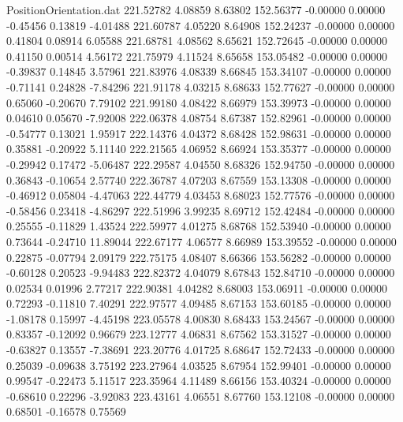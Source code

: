 \begin{filecontents}{PositionOrientation.dat}
 221.52782    4.08859    8.63802   152.56377   -0.00000    0.00000   -0.45456    0.13819   -4.01488
 221.60787    4.05220    8.64908   152.24237   -0.00000    0.00000    0.41804    0.08914    6.05588
 221.68781    4.08562    8.65621   152.72645   -0.00000    0.00000    0.41150    0.00514    4.56172
 221.75979    4.11524    8.65658   153.05482   -0.00000    0.00000   -0.39837    0.14845    3.57961
 221.83976    4.08339    8.66845   153.34107   -0.00000    0.00000   -0.71141    0.24828   -7.84296
 221.91178    4.03215    8.68633   152.77627   -0.00000    0.00000    0.65060   -0.20670    7.79102
 221.99180    4.08422    8.66979   153.39973   -0.00000    0.00000    0.04610    0.05670   -7.92008
 222.06378    4.08754    8.67387   152.82961   -0.00000    0.00000   -0.54777    0.13021    1.95917
 222.14376    4.04372    8.68428   152.98631   -0.00000    0.00000    0.35881   -0.20922    5.11140
 222.21565    4.06952    8.66924   153.35377   -0.00000    0.00000   -0.29942    0.17472   -5.06487
 222.29587    4.04550    8.68326   152.94750   -0.00000    0.00000    0.36843   -0.10654    2.57740
 222.36787    4.07203    8.67559   153.13308   -0.00000    0.00000   -0.46912    0.05804   -4.47063
 222.44779    4.03453    8.68023   152.77576   -0.00000    0.00000   -0.58456    0.23418   -4.86297
 222.51996    3.99235    8.69712   152.42484   -0.00000    0.00000    0.25555   -0.11829    1.43524
 222.59977    4.01275    8.68768   152.53940   -0.00000    0.00000    0.73644   -0.24710   11.89044
 222.67177    4.06577    8.66989   153.39552   -0.00000    0.00000    0.22875   -0.07794    2.09179
 222.75175    4.08407    8.66366   153.56282   -0.00000    0.00000   -0.60128    0.20523   -9.94483
 222.82372    4.04079    8.67843   152.84710   -0.00000    0.00000    0.02534    0.01996    2.77217
 222.90381    4.04282    8.68003   153.06911   -0.00000    0.00000    0.72293   -0.11810    7.40291
 222.97577    4.09485    8.67153   153.60185   -0.00000    0.00000   -1.08178    0.15997   -4.45198
 223.05578    4.00830    8.68433   153.24567   -0.00000    0.00000    0.83357   -0.12092    0.96679
 223.12777    4.06831    8.67562   153.31527   -0.00000    0.00000   -0.63827    0.13557   -7.38691
 223.20776    4.01725    8.68647   152.72433   -0.00000    0.00000    0.25039   -0.09638    3.75192
 223.27964    4.03525    8.67954   152.99401   -0.00000    0.00000    0.99547   -0.22473    5.11517
 223.35964    4.11489    8.66156   153.40324   -0.00000    0.00000   -0.68610    0.22296   -3.92083
 223.43161    4.06551    8.67760   153.12108   -0.00000    0.00000    0.68501   -0.16578    0.75569

\end{filecontents}

